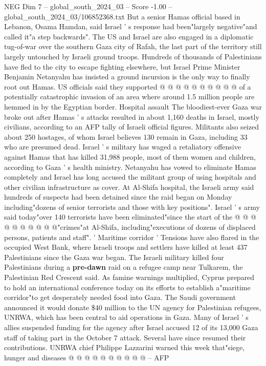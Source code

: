 \begin{textsample}{NEG Dim 7 – global\_south\_2024\_03 – Score -1.00 – global\_south\_2024\_03/106852368.txt}
But a senior Hamas official based in Lebanon, Osama Hamdan, said Israel ' s response had been"largely negative"and called it"a step backwards".
The US and Israel are also engaged in a diplomatic tug-of-war over the southern Gaza city of Rafah, the last part of the territory still largely untouched by Israeli ground troops.
Hundreds of thousands of Palestinians have fled to the city to escape fighting elsewhere, but Israel Prime Minister Benjamin Netanyahu has insisted a ground incursion is the only way to finally root out Hamas.
US officials said they supported @ @ @ @ @ @ @ @ @ @ of a potentially catastrophic invasion of an area where around 1.5 million people are hemmed in by the Egyptian border.
Hospital assault The bloodiest-ever Gaza war broke out after Hamas ' s attacks resulted in about 1,160 deaths in Israel, mostly civilians, according to an AFP tally of Israeli official figures.
Militants also seized about 250 hostages, of whom Israel believes 130 remain in Gaza, including 33 who are presumed dead.
Israel ' s military has waged a retaliatory offensive against Hamas that has killed 31,988 people, most of them women and children, according to Gaza ' s health ministry.
Netanyahu has vowed to eliminate Hamas completely and Israel has long accused the militant group of using hospitals and other civilian infrastructure as cover.
At Al-Shifa hospital, the Israeli army said hundreds of suspects had been detained since the raid began on Monday including"dozens of senior terrorists and those with key positions".
Israel ' s army said today"over 140 terrorists have been eliminated"since the start of the @ @ @ @ @ @ @ @ @ @"crimes"at Al-Shifa, including"executions of dozens of displaced persons, patients and staff". ' Maritime corridor ' Tensions have also flared in the occupied West Bank, where Israeli troops and settlers have killed at least 437 Palestinians since the Gaza war began.
The Israeli military killed four Palestinians during a \textbf{pre-dawn} raid on a refugee camp near Tulkarem, the Palestinian Red Crescent said.
As famine warnings multiplied, Cyprus prepared to hold an international conference today on its efforts to establish a"maritime corridor"to get desperately needed food into Gaza.
The Saudi government announced it would donate \$40 million to the UN agency for Palestinian refugees, UNRWA, which has been central to aid operations in Gaza.
Many of Israel ' s allies suspended funding for the agency after Israel accused 12 of its 13,000 Gaza staff of taking part in the October 7 attack.
Several have since resumed their contributions.
UNRWA chief Philippe Lazzarini warned this week that"siege, hunger and diseases @ @ @ @ @ @ @ @ @ @ -- AFP

\end{textsample}
